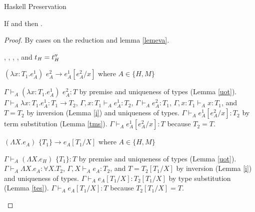 \begin{theorem}{Haskell Preservation}

\label{thmpnh}

If \judeh{}{\first{\varexph}}{\first{\vartyh}} and \redrule{\first{\varexph}}{\second{\varexph}} then \judeh{}{\second{\varexph}}{\first{\vartyh}}.

\begin{proof}

By cases on the reduction \redrule{\first{\varexph}}{\second{\varexph}} and lemma \ref{lemeva}.


\begin{case}{\osfappph}

\pnpremise
{\judeh{}{\osfapplh}{\second{\vartyh}}}
\pntypes
{
\judeh{}{\expfabss{\first{\varvarh}}{\first{\vartyh}}{\first{\varexph}}}{\tyfun{\first{\vartyh}}{\second{\vartyh}}},
\judeh{\envexte{\first{\varvarh}}{\first{\vartyh}}}{\first{\varexph}}{\second{\vartyh}},
\judeh{}{\second{\varexph}}{\first{\vartyh}},
\judeh{\envexte{\first{\varvarh}}{\first{\vartyh}}}{\first{\varvarh}}{\first{\vartyh}}, and
$t_{\mathit{H}} = t_{\mathit{H}}''$
}


$(\lambda x:T_{1}.e_{A}^{1})$ $e_{A}^{2}\rightarrow e_{A}^{1}[e_{A}^{2}/x]$ where $A\in\lbrace H,M\rbrace$

$\Gamma\vdash_{A}(\lambda x:T_{1}.e_{A}^{1})$ $e_{A}^{2}:T$ by premise and uniqueness of types (Lemma \ref{uot}).  $\Gamma\vdash_{A}\lambda x:T_{1}.e_{A}^{1}:T_{1}\rightarrow T_{2}$, $\Gamma,x:T_{1}\vdash_{A}e_{A}^{1}:T_{2}$, $\Gamma\vdash_{A}e_{A}^{2}:T_{1}$, $\Gamma,x:T_{1}\vdash_{A}x:T_{1}$, and $T=T_{2}$ by inversion (Lemma \ref{i}) and uniqueness of types.  $\Gamma\vdash_{A}e_{A}^{1}[e_{A}^{2}/x]:T_{2}$ by term substitution (Lemma \ref{tms}).  $\Gamma\vdash_{A}e_{A}^{1}[e_{A}^{2}/x]:T$ because $T_{2}=T$.
\end{case}


\begin{case}{\ostapp}

$(\Lambda X.e_{A})$ $\lbrace T_{1}\rbrace\rightarrow e_{A}[T_{1}/X]$ where $A\in\lbrace H,M\rbrace$

$\Gamma\vdash_{A}(\Lambda X.e_{H})$ $\lbrace T_{1}\rbrace:T$ by premise and uniqueness of types (Lemma \ref{uot}).  $\Gamma\vdash_{A}\Lambda X.e_{A}:\forall X.T_{2}$, $\Gamma,X\vdash_{A}e_{A}:T_{2}$, and $T=T_{2}[T_{1}/X]$ by inversion (Lemma \ref{i}) and uniqueness of types.  $\Gamma\vdash_{A}e_{A}[T_{1}/X]:T_{2}[T_{1}/X]$ by type substitution (Lemma \ref{tes}).  $\Gamma\vdash_{A}e_{A}[T_{1}/X]:T$ because $T_{2}[T_{1}/X]=T$.
\end{case}


\end{proof}
\end{theorem}
